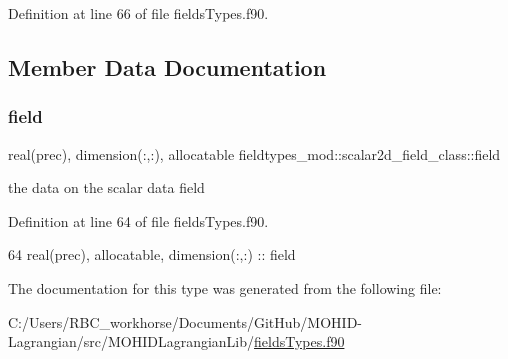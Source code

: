 Definition at line 66 of file fields\+Types.\+f90.



\subsection{Member Data Documentation}
\mbox{\label{structfieldtypes__mod_1_1scalar2d__field__class_a4c3879389ef1af4e218544a5acc3215d}} 
\subsubsection{\texorpdfstring{field}{field}}
{\footnotesize\ttfamily real(prec), dimension(\+:,\+:), allocatable fieldtypes\+\_\+mod\+::scalar2d\+\_\+field\+\_\+class\+::field\hspace{0.3cm}{\ttfamily [private]}}



the data on the scalar data field 



Definition at line 64 of file fields\+Types.\+f90.


\begin{DoxyCode}
64         \textcolor{keywordtype}{real(prec)}, \textcolor{keywordtype}{allocatable}, \textcolor{keywordtype}{dimension(:,:)} :: field
\end{DoxyCode}


The documentation for this type was generated from the following file\+:\begin{DoxyCompactItemize}
\item 
C\+:/\+Users/\+R\+B\+C\+\_\+workhorse/\+Documents/\+Git\+Hub/\+M\+O\+H\+I\+D-\/\+Lagrangian/src/\+M\+O\+H\+I\+D\+Lagrangian\+Lib/\mbox{\hyperlink{fields_types_8f90}{fields\+Types.\+f90}}\end{DoxyCompactItemize}

